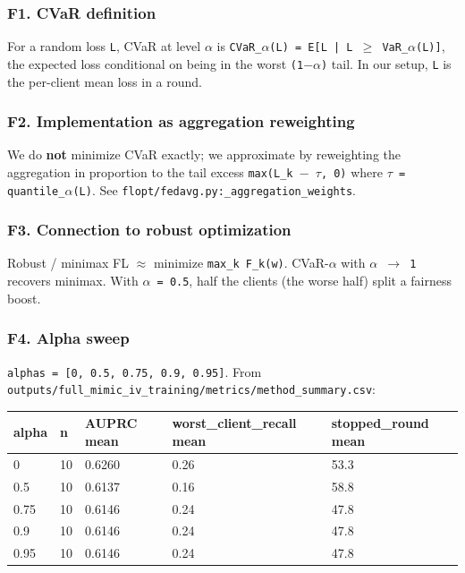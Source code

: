 \documentclass{article}
\begin{document}
\subsubsection{F1. CVaR definition}


For a random loss \texttt{L}, CVaR at level \texttt{\ensuremath{\alpha}} is \texttt{CVaR\_\ensuremath{\alpha}(L) = E[L | L \ensuremath{\geq} VaR\_\ensuremath{\alpha}(L)]}, the expected loss conditional on being in the worst \texttt{(1\ensuremath{-}\ensuremath{\alpha})} tail. In our setup, \texttt{L} is the per-client mean loss in a round.


\subsubsection{F2. Implementation as aggregation reweighting}


We do \textbf{not} minimize CVaR exactly; we approximate by reweighting the aggregation in proportion to the tail excess \texttt{max(L\_k \ensuremath{-} \ensuremath{\tau}, 0)} where \texttt{\ensuremath{\tau} = quantile\_\ensuremath{\alpha}(L)}. See \texttt{flopt/fedavg.py:\_aggregation\_weights}.


\subsubsection{F3. Connection to robust optimization}


Robust / minimax FL \ensuremath{\approx} minimize \texttt{max\_k F\_k(w)}. CVaR-\ensuremath{\alpha} with \texttt{\ensuremath{\alpha} \ensuremath{\rightarrow} 1} recovers minimax. With \texttt{\ensuremath{\alpha} = 0.5}, half the clients (the worse half) split a fairness boost.


\subsubsection{F4. Alpha sweep}


\texttt{alphas = [0, 0.5, 0.75, 0.9, 0.95]}. From \texttt{outputs/full\_mimic\_iv\_training/metrics/method\_summary.csv}:


\begin{table}[H]
  \centering
  \begin{tabular}{lllll}
    \toprule
    alpha & n & AUPRC mean & worst\_client\_recall mean & stopped\_round mean \\
    \midrule
    0 & 10 & 0.6260 & 0.26 & 53.3 \\
    0.5 & 10 & 0.6137 & 0.16 & 58.8 \\
    0.75 & 10 & 0.6146 & 0.24 & 47.8 \\
    0.9 & 10 & 0.6146 & 0.24 & 47.8 \\
    0.95 & 10 & 0.6146 & 0.24 & 47.8 \\
    \bottomrule
  \end{tabular}
\end{table}
\end{document}
